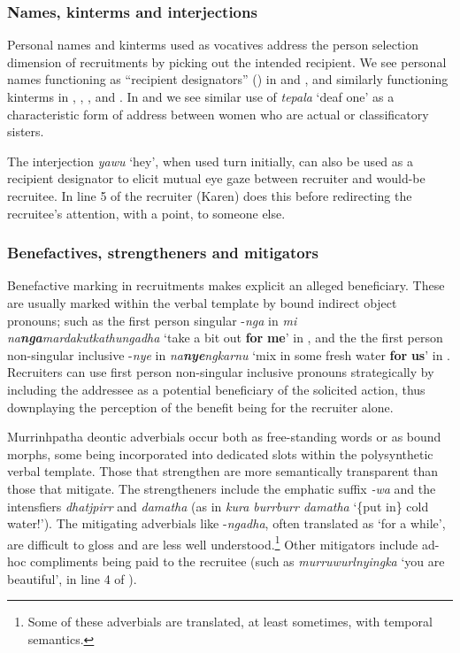 \documentclass[output=paper,nonflat,colorlinks,citecolor=brown]{langsci/langscibook}
\begin{document}
\subsubsection{Names, kinterms and interjections}

Personal names and kinterms used as vocatives address the person selection dimension of recruitments by picking out the intended recipient. We see personal names functioning as “recipient designators” (\citealt[182]{Lerner2003}) in  and , and similarly functioning kinterms in , , ,  and . In  and  we see similar use of \textit{tepala} ‘deaf one’ as a characteristic form of address between women who are actual or classificatory sisters.

The interjection \textit{yawu} ‘hey’, when used turn initially, can also be used as a recipient designator to elicit mutual eye gaze between recruiter and would-be recruitee. In line 5 of  the recruiter (Karen) does this before redirecting the recruitee’s attention, with a point, to someone else.

\subsubsection{Benefactives, strengtheners and mitigators}

Benefactive marking in recruitments makes explicit an alleged beneficiary. These are usually marked within the verbal template by bound indirect object pronouns; such as the first person singular -\textit{nga} in \textit{mi na}\textbf{\textit{nga}}\textit{mardakutkathungadha} ‘take a bit out \textbf{for} \textbf{me}’ in , and the the first person non-singular inclusive -\textit{nye} in \textit{na}\textbf{\textit{nye}}\textit{ngkarnu} ‘mix in some fresh water \textbf{for} \textbf{us}’ in . Recruiters can use first person non-singular inclusive pronouns strategically by including the addressee as a potential beneficiary of the solicited action, thus downplaying the perception of the benefit being for the recruiter alone.


\hspace*{-1mm}Murrinhpatha deontic adverbials occur both as free-standing words or as bound morphs, some being incorporated into dedicated slots within the polysynthetic verbal template. Those that strengthen are more semantically transparent than those that mitigate. The strengtheners include the emphatic suffix \textit{{}-wa} and the intensfiers \textit{dhatjpirr} and \textit{damatha} (as in \textit{kura burrburr damatha} ‘\{put in\} cold water!’). The mitigating adverbials like -\textit{ngadha}, often translated as ‘for a while’, are difficult to gloss and are less well understood.\footnote{Some of these adverbials are translated, at least sometimes, with temporal semantics.} Other mitigators include ad-hoc compliments being paid to the recruitee (such as \textit{murruwurlnyingka} ‘you are beautiful’, in line 4 of ).
\end{document}
